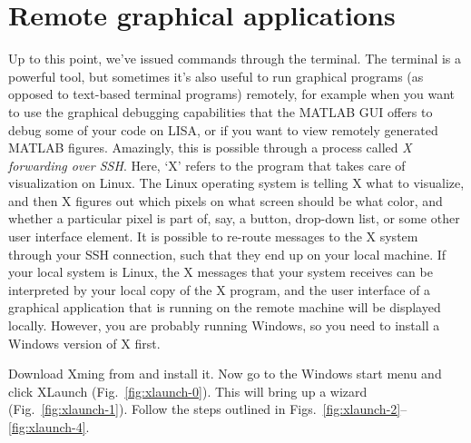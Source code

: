 \chapter{Remote graphical applications}



Up to this point, we've issued commands through the terminal.  The terminal is a powerful tool, but sometimes it's also useful to run graphical programs (as opposed to text-based terminal programs) remotely, for example when you want to use the graphical debugging capabilities that the MATLAB GUI offers to debug some of your code on LISA, or if you want to view remotely generated MATLAB figures.
Amazingly, this is possible through a process called \textit{X forwarding over SSH}. Here, `X' refers to the program that takes care of visualization on Linux. The Linux operating system is telling X what to visualize, and then X figures out which pixels on what screen should be what color, and whether a particular pixel is part of, say, a button, drop-down list, or some other user interface element. It is possible to re-route messages to the X system through your SSH connection, such that they end up on your local machine. If your local system is Linux, the X messages that your system receives can be interpreted by your local copy of the X program, and the user interface of a graphical application that is running on the remote machine will be displayed locally. However, you are probably running Windows, so you need to install a Windows version of X first.

Download Xming from  and install it. Now go to the Windows start menu and click XLaunch (Fig.~\ref{fig:xlaunch-0}). This will bring up a wizard (Fig.~\ref{fig:xlaunch-1}). Follow the steps outlined in Figs.~\ref{fig:xlaunch-2}--\ref{fig:xlaunch-4}.

